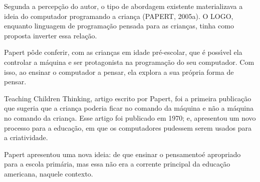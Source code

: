 \documentclass[
12pt,		%
openright,	%
twoside,  %
a4paper,			%
chapter=TITLE,		%
english,			%
french,				%
spanish,			%
brazil				%
]{USPSC-classe/USPSC}
\begin{document}
Segunda a percep\c{c}\~ao do autor, o tipo de abordagem existente materializava a ideia do computador programando a crian\c{c}a (PAPERT, 2005a). O LOGO, enquanto linguagem de programa\c{c}\~ao pensada para as crian\c{c}as, tinha como proposta inverter essa rela\c{c}\~ao.

















Papert p\^ode conferir, com as crian\c{c}as em idade pr\'e-escolar, que \'e poss\'{\i}vel ela controlar a m\'aquina e ser protagonista na programa\c{c}\~ao do seu computador. Com isso, ao ensinar o computador a pensar, ela explora a sua pr\'opria forma de pensar.

















Teaching Children Thinking, artigo escrito por Papert, foi a primeira publica\c{c}\~ao que sugeria que a crian\c{c}a poderia ficar no comando da m\'aquina e n\~ao a m\'aquina no comando da crian\c{c}a.  Esse artigo  foi publicado em 1970; e,  apresentou um novo processo para a educa\c{c}\~ao, em que os computadores pudessem serem usados para a criatividade.

















Papert apresentou uma nova ideia: de que \textquotedbl ensinar o pensamento\textquotedbl   \'e apropriado para a escola prim\'aria, mas essa n\~ao era a corrente principal da educa\c{c}\~ao americana, naquele contexto.
\end{document}
